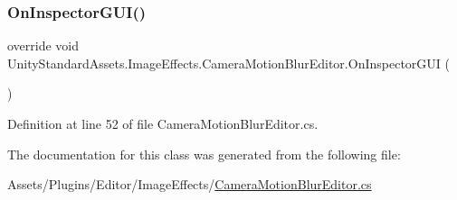 \subsubsection{\texorpdfstring{On\+Inspector\+G\+U\+I()}{OnInspectorGUI()}}
{\footnotesize\ttfamily override void Unity\+Standard\+Assets.\+Image\+Effects.\+Camera\+Motion\+Blur\+Editor.\+On\+Inspector\+G\+UI (\begin{DoxyParamCaption}{ }\end{DoxyParamCaption})}



Definition at line 52 of file Camera\+Motion\+Blur\+Editor.\+cs.



The documentation for this class was generated from the following file\+:\begin{DoxyCompactItemize}
\item 
Assets/\+Plugins/\+Editor/\+Image\+Effects/\mbox{\hyperlink{_camera_motion_blur_editor_8cs}{Camera\+Motion\+Blur\+Editor.\+cs}}\end{DoxyCompactItemize}
